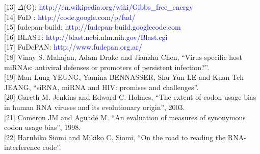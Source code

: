 [13] $\Delta$(G): \textcolor{blue}{http://en.wikipedia.org/wiki/Gibbs\_free\_energy} \\

[14] FuD : \textcolor{blue}{http://code.google.com/p/fud/} \\

[15] fudepan-build: \textcolor{blue}{http://fudepan-build.googlecode.com} \\

[16] BLAST: \textcolor{blue}{http://blast.ncbi.nlm.nih.gov/Blast.cgi} \\

[17] FuDePAN: \textcolor{blue}{http://www.fudepan.org.ar/} \\

[18] Vinay S. Mahajan, Adam Drake and Jianzhu Chen, “Virus-specific host miRNAs: antiviral defenses or promoters of persistent infection?”. \\

[19] Man Lung YEUNG, Yamina BENNASSER, Shu Yun LE and Kuan Teh JEANG, “siRNA, miRNA and HIV: promises and challenges”. \\

[20] Gareth M. Jenkins and Edward C. Holmes, “The extent of codon usage bias in human RNA viruses and its evolutionary origin”, 2003. \\

[21] Comeron JM and Aguadé M. “An evaluation of measures of synonymous codon usage bias”, 1998. \\

[22] Haruhiko Siomi and Mikiko C. Siomi, “On the road to reading the RNA-interference code”. \\
